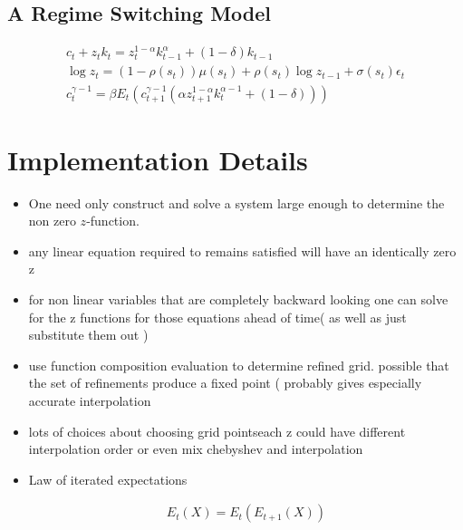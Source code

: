 \documentclass[12pt]{article}
\begin{document}
\subsection{A Regime Switching Model}
\label{sec:regime-switch-model}



\cite{foerster13}

\begin{gather*}
c_t + z_t k_t = z_t^{1-\alpha} k_{t-1}^\alpha + (1-\delta)k_{t-1}\\
 \log z_t = (1-\rho(s_t))\mu(s_t) + \rho(s_t)\log z_{t-1}+ \sigma(s_t) \epsilon_t\\
 c_t^{\gamma-1} = \beta  
 E_t ( c_{t+1}^{\gamma-1} (\alpha z_{t+1}^{1-\alpha} k_t^{\alpha -1} + (1-\delta) ))
\end{gather*}



\section{Implementation Details }
\label{sec:implementation}



\begin{itemize}
\item One need only construct and solve a system large enough to determine the non zero $z$-function.
\item any linear equation required to remains satisfied will have an identically zero z
\item for non linear variables that are completely backward looking one can solve for the z functions for those equations 
ahead of time( as well as just substitute them out )
\item use function composition evaluation to determine refined grid. possible that the set of refinements produce a fixed point  ( probably gives especially accurate interpolation
\item lots of choices about choosing grid pointseach z could have different interpolation order or even mix chebyshev and interpolation
\item Law of iterated expectations

  \begin{gather}
    E_t(X) = E_t(E_{t+1}(X))
  \end{gather}
\end{itemize}
  
\end{document}
